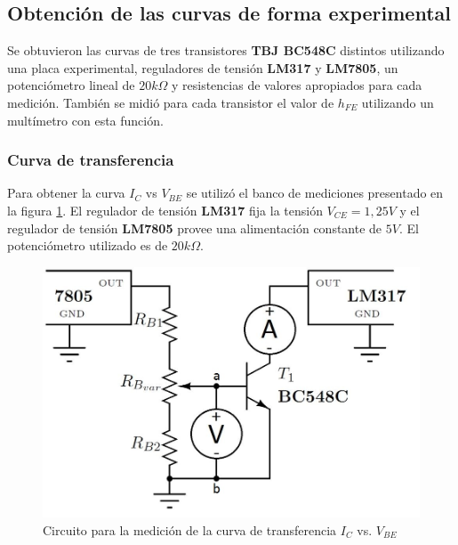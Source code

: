 \documentclass[10pt,spanish,a4paper,openany,notitlepage]{article}
\begin{document}
\subsection{Obtención de las curvas de forma experimental}

Se obtuvieron las curvas de tres transistores \textbf{TBJ BC548C} distintos 
utilizando una placa experimental, reguladores de tensión \textbf{LM317} y 
 \textbf{LM7805}, un potenciómetro lineal de $20\unit{k\Omega}$ y resistencias de valores apropiados para cada medición.
También se midió para cada transistor el valor de $h_{FE}$ utilizando un multímetro con esta función.

\subsubsection{Curva de transferencia}

Para obtener la curva $I_C$ vs $V_{BE}$ se utilizó el banco de mediciones 
presentado en la figura \ref{circuito:medicion_transferencia}. El regulador de 
tensión \textbf{LM317} fija la tensión $V_{CE}=1,25\unit{V}$ y el regulador de 
tensión \textbf{LM7805} provee una alimentación constante de $5\unit{V}$. 
El potenciómetro utilizado es de $20 \unit{k\Omega}$.

\begin{figure}[H] %
\begin{center}
\includegraphics[scale=0.3]{./imagenes/ic_vbe.jpg}
\caption{Circuito para la medición de la curva de transferencia $I_C$ vs. $V_{BE}$}
 \label{circuito:medicion_transferencia}
\end{center}
\end{figure}
\end{document}
